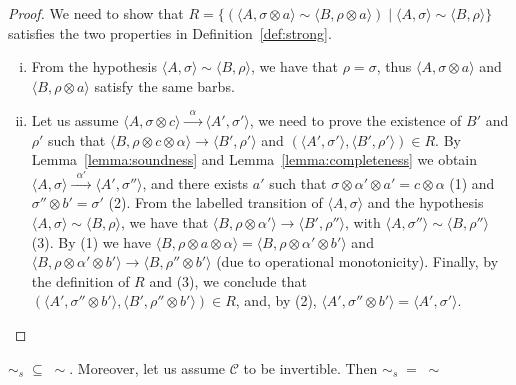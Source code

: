 \documentclass[main.tex]{subfiles}
\begin{document}
\begin{proof}%
	We need to show that $R = \{ (\langle A, \sigma \otimes a \rangle \sim \langle B, \rho \otimes a\rangle) \mid  \langle A, \sigma\rangle \sim \langle B, \rho\rangle\}$ satisfies the two properties in Definition~\ref{def:strong}.
	\begin{enumerate}[i)]
		\item From the hypothesis $\langle A, \sigma\rangle \sim \langle B, \rho\rangle$, we have that $\rho = \sigma$,
		thus $\langle A, \sigma \otimes a \rangle$ and $\langle B, \rho \otimes a\rangle$ satisfy the same barbs.
		
		\item Let us assume $\langle A, \sigma \otimes c \rangle  \xrightarrow{\; \; \alpha\;  \;} \langle A', \sigma'\rangle$,
		we need to prove the existence of $B'$ and $\rho'$ such that $\langle B, \rho \otimes c \otimes \alpha \rangle  \rightarrow \langle B', \rho'\rangle$ and $(\langle A', \sigma' \rangle, \langle B', \rho'\rangle) \in R$. 
		By Lemma~\ref{lemma:soundness} and Lemma~\ref{lemma:completeness} we obtain $\langle A, \sigma \rangle \xrightarrow{\; \; \alpha'\;  \;} \langle A', \sigma''\rangle$, and there exists $a'$ such that $\sigma \otimes \alpha' \otimes a' = c \otimes \alpha$ (1) and $\sigma'' \otimes b' = \sigma'$ (2).
		From the labelled transition of $\langle A, \sigma\rangle$ and the hypothesis $\langle A, \sigma \rangle \sim \langle B, \rho \rangle$, we have that $\langle B, \rho \otimes \alpha' \rangle \rightarrow \langle B', \rho''\rangle$, with $\langle A, \sigma''\rangle \sim \langle B, \rho''\rangle$ (3). By (1) we have $\langle B, \rho \otimes a \otimes \alpha \rangle = \langle B, \rho \otimes \alpha' \otimes
		b' \rangle$ and $\langle B, \rho \otimes \alpha' \otimes b' \rangle \rightarrow \langle  B, \rho'' \otimes b' \rangle$ (due to
		operational monotonicity). Finally, by the definition of $R$ and (3), we conclude that $(\langle A', \sigma'' \otimes b' \rangle, \langle B', \rho'' \otimes b'\rangle) \in R$, and, by (2), $\langle A', \sigma'' \otimes b' \rangle = \langle A', \sigma'\rangle$.
	\end{enumerate} 
\end{proof}




\begin{theorem}\label{stronEq}
$\sim_{\mathit{s}} \; \subseteq \; \sim$. Moreover, let us assume $\mathcal{C}$ to be invertible.
Then $\sim_{\mathit{s}} \; = \; \sim$
\end{theorem}
\end{document}
